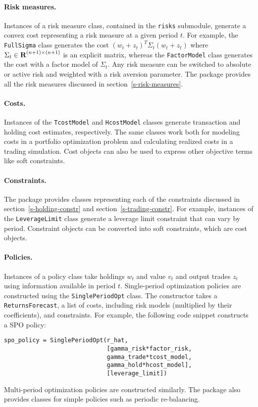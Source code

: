 \documentclass[openany]{article}  %
\renewcommand{\S}{section~}
\begin{document}
\paragraph{Risk measures.} Instances of a risk measure class,
contained in the \verb|risks| submodule,
generate a convex cost representing a risk measure at a given period $t$.
For example, the \verb|FullSigma| class generates the cost $(w_t +
z_t)^T\Sigma_t(w_t + z_t)$ where $\Sigma_t \in {\mbox{\bf R}}^{(n+1) \times (n+1)}$ is
an explicit matrix, whereas the \verb|FactorModel| class generates the
cost with a factor model of $\Sigma_t$.
Any risk measure can be switched to absolute or active risk and weighted with a
risk aversion parameter.
The package provides all the risk measures discussed in \S\ref{s-risk-measures}.

\paragraph{Costs.} Instances of the \verb|TcostModel| and \verb|HcostModel| classes generate
transaction and holding cost estimates, respectively.
The same classes work both for modeling costs in a portfolio optimization
problem and calculating realized costs in a trading simulation.
Cost objects can also be used to express other objective terms like soft constraints.

\paragraph{Constraints.} The package provides classes representing each of the
constraints discussed in \S\ref{s-holding-constr} and \S\ref{s-trading-constr}.
For example, instances of the \verb|LeverageLimit| class generate a leverage limit
constraint that can vary by period.
Constraint objects can be converted into soft constraints, which are cost objects.

\paragraph{Policies.} Instances of a policy class take holdings $w_t$ and value $v_t$ and
output trades $z_t$ using information available in period $t$.
Single-period optimization policies are constructed using the
\verb|SinglePeriodOpt| class.
The constructor takes a \verb|ReturnsForecast|, a list of
costs, including risk models (multiplied by their coefficients), and constraints.
For example, the following code snippet constructs a SPO policy:
\begin{verbatim}
spo_policy = SinglePeriodOpt(r_hat,
                             [gamma_risk*factor_risk,
                             gamma_trade*tcost_model,
                             gamma_hold*hcost_model],
                             [leverage_limit])
\end{verbatim}
Multi-period optimization policies are constructed similarly.
The package also provides classes for simple policies such as periodic re-balancing.
\end{document}
